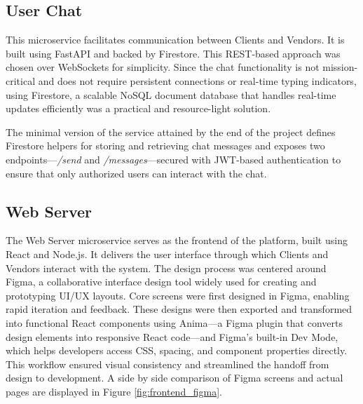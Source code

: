\documentclass[11pt,a4paper]{article}
\begin{document}
\subsection{User Chat}

This microservice facilitates communication between Clients and
Vendors. It is built using FastAPI and backed by Firestore.
This REST-based approach was chosen over WebSockets for simplicity.
Since the chat functionality is not mission-critical and does not
require persistent connections or real-time typing indicators, using
Firestore, a scalable NoSQL document database that handles real-time
updates efficiently was a practical and resource-light solution.

The minimal version of the service attained by the end of the project
defines Firestore helpers for storing and retrieving chat messages
and exposes two endpoints—\textit{/send} and
\textit{/messages}—secured with JWT-based authentication to ensure
that only authorized users can interact with the chat.

\subsection{Web Server}

The Web Server microservice serves as the frontend of the platform,
built using React and Node.js. It delivers the user interface through
which Clients and Vendors interact with the system. The design
process was centered around Figma, a collaborative interface design
tool widely used for creating and prototyping UI/UX layouts. Core
screens were first designed in Figma, enabling rapid iteration and
feedback. These designs were then exported and transformed into
functional React components using Anima—a Figma plugin that converts
design elements into responsive React code—and Figma’s built-in Dev
Mode, which helps developers access CSS, spacing, and component
properties directly. This workflow ensured visual consistency and
streamlined the handoff from design to development. A side by side
comparison of Figma screens and actual pages are displayed in Figure
\ref{fig:frontend_figma}.
\end{document}
